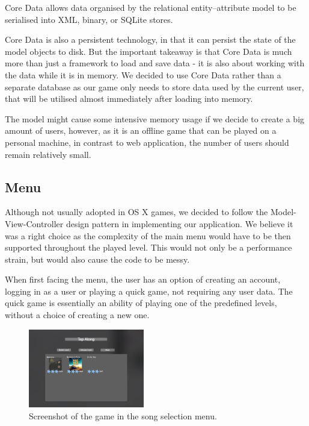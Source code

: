Core Data allows data organised by the relational entity–attribute model to be serialised into XML, binary, or SQLite stores.

Core Data is also a persistent technology, in that it can persist the state of the model objects to disk. But the important takeaway is that Core Data is much more than just a framework to load and save data - it is also about working with the data while it is in memory.
We decided to use Core Data rather than a separate database as our game only needs to store data used by the current user, that will be utilised almost immediately after loading into memory. 
  
The model might cause some intensive memory usage if we decide to create a big amount of users, however, as it is an offline game that can be played on a personal machine, in contrast to web application, the number of users should remain relatively small.

\vspace{10pt}

\subsection{Menu}

Although not usually adopted in OS X games, we decided to follow the Model-View-Controller design pattern in implementing our application. We believe it was a right choice as the complexity of the main menu would have to be then supported throughout the played level. This would not only be a performance strain, but would also cause the code to be messy.

When first facing the menu, the user has an option of creating an account, logging in as a user or playing a quick game, not requiring any user data. 
The quick game is essentially an ability of playing one of the predefined levels, without a choice of creating a new one.

\begin{figure}
  \begin{center}
    \includegraphics[width=0.45\textwidth]{Figures/CollectionView}
  \end{center}
  \caption{Screenshot of the game in the song selection menu.}
\label{fig:songselection}
\end{figure}


